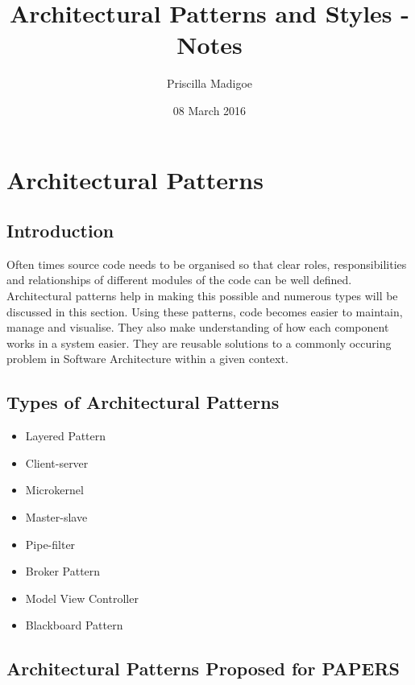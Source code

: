 \documentclass[a4paper,12pt]{article}
\begin{document}
\title{Architectural Patterns and Styles - Notes}
\author{Priscilla Madigoe}
\date{08 March 2016}
\maketitle
 
\section{Architectural Patterns}

\subsection{Introduction}
Often times source code needs to be organised so that clear roles, responsibilities and relationships of different modules of the code can be well defined. Architectural patterns help in making this possible and numerous types will be discussed in this section. Using these patterns, code becomes easier to maintain, manage and visualise. They also make understanding of how each component works in a system easier. They are reusable solutions to a commonly occuring problem in Software Architecture within a given context.

\subsection{Types of Architectural Patterns}

\begin{itemize}
\item Layered Pattern
\item Client-server
\item Microkernel
\item Master-slave
\item Pipe-filter
\item Broker Pattern
\item Model View Controller
\item Blackboard Pattern
\end{itemize}

\subsection{Architectural Patterns Proposed for PAPERS}
\end{document}
